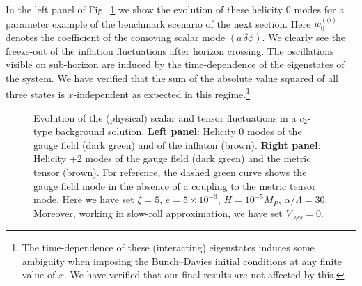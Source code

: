 In the left panel of Fig.~\ref{fig:fluctuations} we show the evolution of these helicity 0 modes for a parameter example of the benchmark scenario of the next section. Here $w_0^{(\phi)}$ denotes the coefficient of the comoving scalar mode $(a \, \delta \phi)$. {We clearly see the freeze-out of the inflation fluctuations after horizon crossing. The oscillations visible on sub-horizon are induced by the time-dependence of the eigenstates of the system. We have verified that the sum of the absolute value squared of all three states is $x$-independent as expected in this regime.\footnote{{The time-dependence of these (interacting)  eigenstates induces some ambiguity when imposing the Bunch--Davies initial conditions at any finite value of $x$. We have verified that our final results are not affected by this.}}
}



\begin{figure}
\hfill
{}
\caption{Evolution of the (physical) scalar  and tensor fluctuations in a $c_2$-type background solution. \textbf{Left panel}: Helicity $0$ modes of the gauge field (dark green) and of the inflaton (brown). \textbf{Right panel}: Helicity $+2$ modes of the gauge field (dark green) and the metric tensor (brown). For reference, the dashed green curve shows the gauge field mode in the absence of a coupling to the metric tensor mode. Here we have set $\xi = 5$, $e = 5 \times 10^{-3}$, $H = 10^{-5} M_P$, $\alpha/\Lambda = 30$.  {Moreover, working in slow-roll approximation, we have set $V_{,\phi \phi} = 0$.}}
  \label{fig:fluctuations}
\end{figure}


